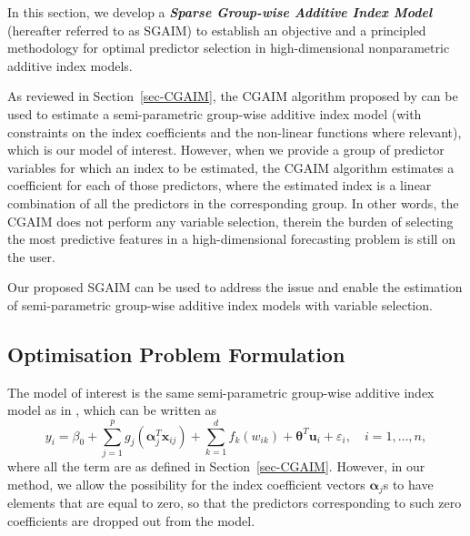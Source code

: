 \documentclass[11pt,a4paper,]{article}
\begin{document}
In this section, we develop a \textbf{\emph{Sparse Group-wise Additive
Index Model}} (hereafter referred to as SGAIM) to establish an objective
and a principled methodology for optimal predictor selection in
high-dimensional nonparametric additive index models.

As reviewed in Section~\ref{sec-CGAIM}, the CGAIM algorithm proposed by
\textcite{Masselot2022} can be used to estimate a semi-parametric
group-wise additive index model (with constraints on the index
coefficients and the non-linear functions where relevant), which is our
model of interest. However, when we provide a group of predictor
variables for which an index to be estimated, the CGAIM algorithm
estimates a coefficient for each of those predictors, where the
estimated index is a linear combination of all the predictors in the
corresponding group. In other words, the CGAIM does not perform any
variable selection, therein the burden of selecting the most predictive
features in a high-dimensional forecasting problem is still on the user.

Our proposed SGAIM can be used to address the issue and enable the
estimation of semi-parametric group-wise additive index models with
variable selection.

\hypertarget{optimisation-problem-formulation}{%
\subsection{Optimisation Problem
Formulation}\label{optimisation-problem-formulation}}

The model of interest is the same semi-parametric group-wise additive
index model as in \textcite{Masselot2022}, which can be written as \[
  y_{i} = \beta_{0} + \sum_{j = 1}^{p}g_{j}(\bm{\alpha}_{j}^{T}\bm{x}_{ij}) + \sum_{k = 1}^{d}f_{k}(w_{ik}) + \bm{\theta}^{T}\bm{u}_{i} + \varepsilon_{i}, \quad i = 1, \dots, n,
\] where all the term are as defined in Section~\ref{sec-CGAIM}.
However, in our method, we allow the possibility for the index
coefficient vectors \(\bm{\alpha}_{j}\)s to have elements that are equal
to zero, so that the predictors corresponding to such zero coefficients
are dropped out from the model.
\end{document}
